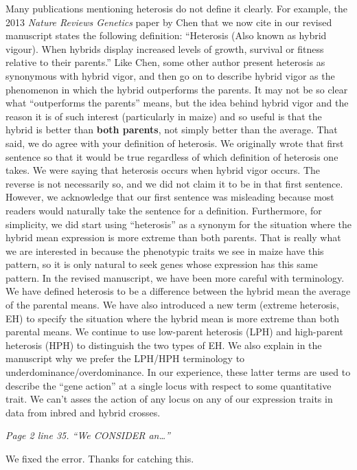 \documentclass{article}
\newcommand{\comment}[1]{\textit{#1}}
\newcommand{\response}[1]{#1}
\begin{document}
\response{Many publications mentioning heterosis do not define it clearly.  For example, the 2013 {\em Nature Reviews Genetics} paper by Chen that we now cite in our revised manuscript states the following definition: ``Heterosis (Also known as hybrid vigour).  When hybrids display increased levels of growth, survival or fitness relative to their parents.''  Like Chen, some other author present heterosis as synonymous with hybrid vigor, and then go on to describe hybrid vigor as the phenomenon in which the hybrid outperforms the parents.  It may not be so clear what ``outperforms the parents'' means, but the idea behind hybrid vigor and the reason it is of such interest (particularly in maize) and so useful is that the hybrid is better than {\bf both parents}, not simply better than the average.  That said, we do agree with your definition of heterosis.  We originally wrote that first sentence so that it would be true regardless of which definition of heterosis one takes.  We were saying that heterosis occurs when hybrid vigor occurs.  The reverse is not necessarily so, and we did not claim it to be in that first sentence.  However, we acknowledge that our first sentence was misleading because most readers would naturally take the sentence for a definition.  Furthermore, for simplicity, we did start using ``heterosis'' as a synonym for the situation where the hybrid mean expression is more extreme than both parents.  That is really what we are interested in because the phenotypic traits we see in maize have this pattern, so it is only natural to seek genes whose expression has this same pattern.  In the revised manuscript, we have been more careful with terminology.  We have defined heterosis to be a difference between the hybrid mean the average of the parental means.  We have also introduced a new term (extreme heterosis, EH) to specify the situation where the hybrid mean is more extreme than both parental means.  We continue to use low-parent heterosis (LPH) and high-parent heterosis (HPH) to distinguish the two types of EH.  We also explain in the manuscript why we prefer the LPH/HPH terminology to underdominance/overdominance.  In our experience, these latter terms are used to describe the ``gene action'' at a single locus with respect to some quantitative trait.  We can't asses the action of any locus on any of our expression traits in data from inbred and hybrid crosses.}

\comment{Page 2 line 35.  “We CONSIDER an…”}

\response{We fixed the error.  Thanks for catching this.}
\end{document}
